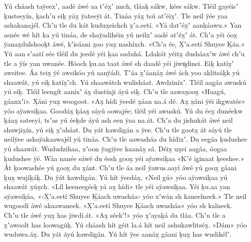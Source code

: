 \begin{pairs}
\begin{Leftside}
Yú cháash taÿeexʼ, aadé áwé aa tʼéx̱ʼ nuch, tláaḵ sákw, kées sákw.
Tléil g̱ayéisʼ ḵusteeyín, ḵachʼu eiḵ yáx̱ ÿateeÿi át.
Tináa yáx̱ tsú atʼéix̱ʼ.
Tle neil ÿée yaa ashakanajél.
Chʼu tle du kát kudux̱eichch x̱ʼa.eetí.
«\!Yá datʼéx̱ʼ aanḵáawu.\!»
Yan asnée wé hít ka yú tináa, de shaÿadihéin yú neilxʼ aadé atʼéx̱ʼ át.
Chʼa yéi óox̱ ÿanax̱dulshooḵt áwé, kʼisáani x̱oo yux̱ nashíxch.
«\!Chʼa ée, X̱ʼa.eetí Shuyee Ḵáa.\!»
\pend
\pstart
{}Yú aan sʼaatí sée tléil du jeedé yéi ḵaa saduhá.
Ldakát yéitx̱ dusháaxʼw áwé chʼu tle a ÿís yan uwanée.
Hóoch ḵu.aa taat áwé sh daadé yéi jiwu̬dinei.
Eiḵ katíx̱ʼ awsitee.
Áa teix̱ ÿé awsikóo yú aanÿádi.
Tʼáa x̱ʼáa\-náx̱ áwé ách yoo aklitsáḵk yú shaawát, yú eiḵ katíx̱ʼch.
Yú shaawátch wulisháat.
Aw\-dziníxʼ.
Tléil aag̱áa awuskú yú eiḵ.
Tléil leen\-gít aaníxʼ áx̱ dustínji áyú eiḵ.
Chʼu tle aawax̱oox̱ «\!Haagú, gáanxʼi\!».
X̱áni yux̱ woogoot.
«\!Ax̱ hídi ÿeedé x̱áan na.á dé.
Ax̱ x̱áni ÿéi ikg̱watée\!»
yóo aÿawsiḵaa.
Goodáx̱ ḵáax̱ sáyú oowajée;
tléil yéi awus\-kú.
Yú du éex̱ dunéekw ḵáax̱ sateeyí, tsʼas yú éeḵde áyú ash een ÿaa na.át.
Chʼa du jishukát áwé neil shuwjix̱ín, yú eiḵ x̱ʼaháat.
Du yát kawdigán a ÿee.
Chʼu tle gootx̱ át sáyú tle neilÿee ashaÿakaawajél yú tináa.
Chʼu tle aawasháa du hídixʼ.
\pend
\pstart
{}Du eeg̱áa ḵudushee yú shaawát.
Wu\-dudzihaa, xʼoon ÿagiÿee kaanáx̱ sá.
Déix̱ ux̱ei aag̱áa, óog̱aa ḵudushee ÿé.
Wáa nanée sáwé du éesh goox̱ yéi aÿawsiḵaa
«\!Kʼé ig̱inaat ḵeeshee.\!»
Át ḵoowashée yú goox̱ du x̱ánt.
Chʼu tle áa neil ÿawus.aayí áwé yú goox̱ gáani ḵux̱ wujiḵáḵ.
Du ÿát kawdigán.
Yú hít ÿeedáx̱, «\!Neil gú\!» yóo aÿawsiḵaa yú shaawát x̱úx̱ch.
«\!Líl keeneegéeḵ yá ax̱ hídi\!» tle yéi aÿawsiḵaa.
Yéi ḵu.aa yan aÿawsiḵáa,
«\!‹\!X̱ʼa.eetí Shuyee Ḵáach uwa\-sháa\!› yóo xʼwán sh kaneelneek.\!»
Tle neil wugoodí áwé akaawaneek.
«\!X̱ʼa.eetí Shu\-yee Ḵáach uwasháa\!» yóo sh kalneek.
Chʼu tle áwé yux̱ has jiwdi.át.
«\!Ax̱ séekʼ!\!» yóo x̱ʼayaḵá du tláa.
Chʼu tle a x̱ʼawoolt has loowagúḵ.
Yú cháash hít géit la.á hít neil ashukawlitséx̱.
«\!Dám\!» yóo wuduwa.áx̱.
Du yát áyú kawdigán.
Yú hít ÿee aanáx̱ gáani ḵux̱ has wudikélʼ.

\end{Leftside}
\end{pairs}
